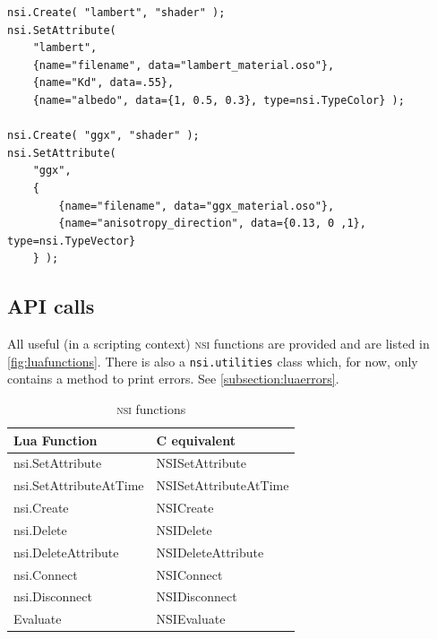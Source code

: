\documentclass[oneside,ebook]{memoir}
\newcommand*{\acronym}[1]{\textsc{\lowercase{#1}}}
\begin{document}
{
\footnotesize
\begin{lstlisting}[caption={Shader creation example in Lua},label={fig:lua_shader}, frame=top, frame=bottom]
nsi.Create( "lambert", "shader" );
nsi.SetAttribute(
    "lambert",
    {name="filename", data="lambert_material.oso"},
    {name="Kd", data=.55},
    {name="albedo", data={1, 0.5, 0.3}, type=nsi.TypeColor} );

nsi.Create( "ggx", "shader" );
nsi.SetAttribute(
    "ggx",
    {
        {name="filename", data="ggx_material.oso"},
        {name="anisotropy_direction", data={0.13, 0 ,1}, type=nsi.TypeVector}
    } );
\end{lstlisting}
}

\subsection{API calls}
All useful (in a scripting context) \acronym{NSI} functions are provided and are listed in \autoref{fig:luafunctions}. There is also a \lstinline|nsi.utilities| class which, for now, only contains a method to print errors. See \autoref{subsection:luaerrors}.
\begin{table}[ht]
	\centering
	\begin{tabular}[c]{ll} \toprule
	\textbf{Lua Function} & \textbf{C equivalent} \\ \midrule
	nsi.SetAttribute & NSISetAttribute \\
	nsi.SetAttributeAtTime & NSISetAttributeAtTime \\
	nsi.Create & NSICreate \\
	nsi.Delete & NSIDelete \\
	nsi.DeleteAttribute & NSIDeleteAttribute\\
	nsi.Connect & NSIConnect \\
	nsi.Disconnect & NSIDisconnect \\
	Evaluate & NSIEvaluate \\ \bottomrule
	\end{tabular}
	\caption{\acronym{NSI} functions}\label{fig:luafunctions}
\end{table}
\end{document}
